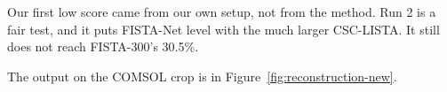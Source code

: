 \begin{keyidea}
Our first low score came from our own setup, not from the method. Run 2 is a fair test, and it puts FISTA-Net level with
the much larger CSC-LISTA. It still does not reach FISTA-300's 30.5\%.
\end{keyidea}

The output on the COMSOL crop is in Figure~\ref{fig:reconstruction-new}.
